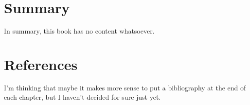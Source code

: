 \documentclass[
  letterpaper,
  DIV=11,
  numbers=noendperiod]{scrreprt}
\newlength{\cslhangindent}
\newenvironment{CSLReferences}[2] %
 {\begin{list}{}{%
  \setlength{\itemindent}{0pt}
  \setlength{\leftmargin}{0pt}
  \setlength{\parsep}{0pt}
  \ifodd #1
   \setlength{\leftmargin}{\cslhangindent}
   \setlength{\itemindent}{-1\cslhangindent}
  \fi
  \setlength{\itemsep}{#2\baselineskip}}}
 {\end{list}}
\begin{document}
\chapter{Summary}\label{summary}

In summary, this book has no content whatsoever.


\chapter*{References}\label{references}


\label{refs}
\begin{CSLReferences}{0}{1}
\end{CSLReferences}

I'm thinking that maybe it makes more sense to put a bibliography at the
end of each chapter, but I haven't decided for sure just yet.
\end{document}
